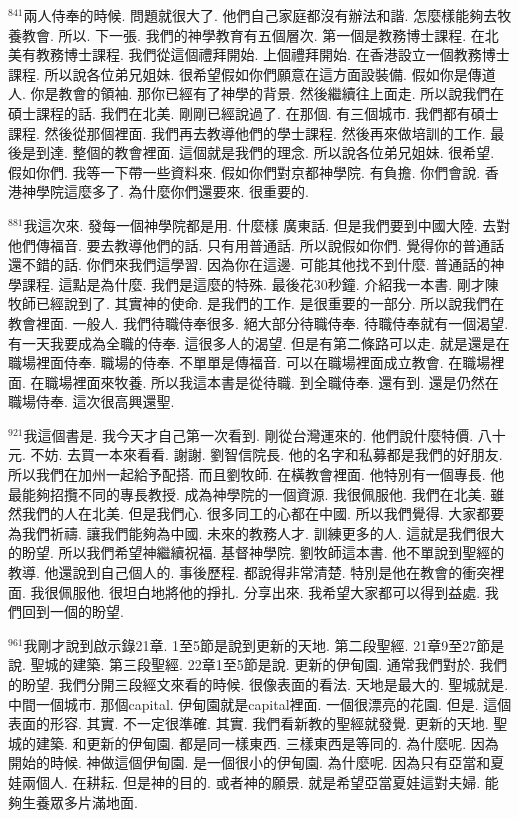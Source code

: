 \documentclass{book}
\begin{document}
$^{841}$兩人侍奉的時候.
問題就很大了.
他們自己家庭都沒有辦法和諧.
怎麼樣能夠去牧養教會.
所以.
下一張.
我們的神學教育有五個層次.
第一個是教務博士課程.
在北美有教務博士課程.
我們從這個禮拜開始.
上個禮拜開始.
在香港設立一個教務博士課程.
所以說各位弟兄姐妹.
很希望假如你們願意在這方面設裝備.
假如你是傳道人.
你是教會的領袖.
那你已經有了神學的背景.
然後繼續往上面走.
所以說我們在碩士課程的話.
我們在北美.
剛剛已經說過了.
在那個.
有三個城市.
我們都有碩士課程.
然後從那個裡面.
我們再去教導他們的學士課程.
然後再來做培訓的工作.
最後是到達.
整個的教會裡面.
這個就是我們的理念.
所以說各位弟兄姐妹.
很希望.
假如你們.
我等一下帶一些資料來.
假如你們對京都神學院.
有負擔.
你們會說.
香港神學院這麼多了.
為什麼你們還要來.
很重要的.

$^{881}$我這次來.
發每一個神學院都是用.
什麼樣 廣東話.
但是我們要到中國大陸.
去對他們傳福音.
要去教導他們的話.
只有用普通話.
所以說假如你們.
覺得你的普通話還不錯的話.
你們來我們這學習.
因為你在這邊.
可能其他找不到什麼.
普通話的神學課程.
這點是為什麼.
我們是這麼的特殊.
最後花30秒鐘.
介紹我一本書.
剛才陳牧師已經說到了.
其實神的使命.
是我們的工作.
是很重要的一部分.
所以說我們在教會裡面.
一般人.
我們待職侍奉很多.
絕大部分待職侍奉.
待職侍奉就有一個渴望.
有一天我要成為全職的侍奉.
這很多人的渴望.
但是有第二條路可以走.
就是還是在職場裡面侍奉.
職場的侍奉.
不單單是傳福音.
可以在職場裡面成立教會.
在職場裡面.
在職場裡面來牧養.
所以我這本書是從待職.
到全職侍奉.
還有到.
還是仍然在職場侍奉.
這次很高興還聖.

$^{921}$我這個書是.
我今天才自己第一次看到.
剛從台灣運來的.
他們說什麼特價.
八十元.
不妨.
去買一本來看看.
謝謝.
劉智信院長.
他的名字和私募都是我們的好朋友.
所以我們在加州一起給予配搭.
而且劉牧師.
在橫教會裡面.
他特別有一個專長.
他最能夠招攬不同的專長教授.
成為神學院的一個資源.
我很佩服他.
我們在北美.
雖然我們的人在北美.
但是我們心.
很多同工的心都在中國.
所以我們覺得.
大家都要為我們祈禱.
讓我們能夠為中國.
未來的教務人才.
訓練更多的人.
這就是我們很大的盼望.
所以我們希望神繼續祝福.
基督神學院.
劉牧師這本書.
他不單說到聖經的教導.
他還說到自己個人的.
事後歷程.
都說得非常清楚.
特別是他在教會的衝突裡面.
我很佩服他.
很坦白地將他的掙扎.
分享出來.
我希望大家都可以得到益處.
我們回到一個的盼望.

$^{961}$我剛才說到啟示錄21章.
1至5節是說到更新的天地.
第二段聖經.
21章9至27節是說.
聖城的建築.
第三段聖經.
22章1至5節是說.
更新的伊甸園.
通常我們對於.
我們的盼望.
我們分開三段經文來看的時候.
很像表面的看法.
天地是最大的.
聖城就是.
中間一個城市.
那個capital.
伊甸園就是capital裡面.
一個很漂亮的花園.
但是.
這個表面的形容.
其實.
不一定很準確.
其實.
我們看新教的聖經就發覺.
更新的天地.
聖城的建築.
和更新的伊甸園.
都是同一樣東西.
三樣東西是等同的.
為什麼呢.
因為開始的時候.
神做這個伊甸園.
是一個很小的伊甸園.
為什麼呢.
因為只有亞當和夏娃兩個人.
在耕耘.
但是神的目的.
或者神的願景.
就是希望亞當夏娃這對夫婦.
能夠生養眾多片滿地面.
\end{document}
